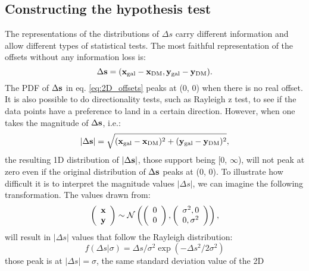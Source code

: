 \subsection{Constructing the hypothesis test} 

The representations of the distributions of $\Delta s$ carry
different information and allow different types of statistical tests. 
The most faithful representation of the offsets without any information loss
is:
\begin{equation}
	\Delta {\bf s} = ({\bf x}_{\rm gal} - {\bf x}_{\rm DM}, 
	{\bf y}_{\rm gal} - {\bf y}_{\rm DM} ).
	\label{eq:2D_offsets}
\end{equation}
The PDF of $\Delta {\bf s}$ in eq. \ref{eq:2D_offsets} peaks at (0, 0) when
there is no real offset. It is also possible to do directionality tests,
such as Rayleigh z test, to see if the data points have a preference to land in
a certain direction.
However, when one takes the magnitude of $\Delta {\bf s}$, i.e.:
\begin{equation}
	|\Delta {\bf s}| = \sqrt{({\bf x}_{\rm gal} - {\bf x}_{\rm DM})^2 + 
	({\bf y}_{\rm gal} - {\bf y}_{\rm DM})^2},
	\label{eq:magnitude_offsets}
\end{equation}
the resulting 1D distribution of $|\Delta {\bf s}|$, 
those support being [0, $\infty$),
will not peak at zero even if the original
distribution of $\Delta {\bf s}$ peaks at (0, 0). 
To illustrate how difficult it is to interpret the magnitude values $|\Delta
s|$,  
we can imagine the following transformation.
The values drawn from: 
\begin{equation}
	\left(\begin{array}{c}
			\bf{x}\\
			\bf{y}
		\end{array}
	\right) \sim \mathcal{N}\left(
	\left(
		\begin{array}{c}
			0 \\
			0
		\end{array}
	\right),
	\left(\begin{array}{cc}
		\sigma^2, 0 \\
		0, \sigma^2
	 \end{array}
	\right)
\right),
\end{equation}
will result in $|\Delta s|$ values that follow the Rayleigh distribution:
\begin{equation}
	f(\Delta s | \sigma) = \Delta s /  \sigma^2 \exp(-\Delta s^2 / 2 \sigma^2)
\end{equation}
those peak is at $|\Delta s| = \sigma$, the same standard deviation value of the 2D
